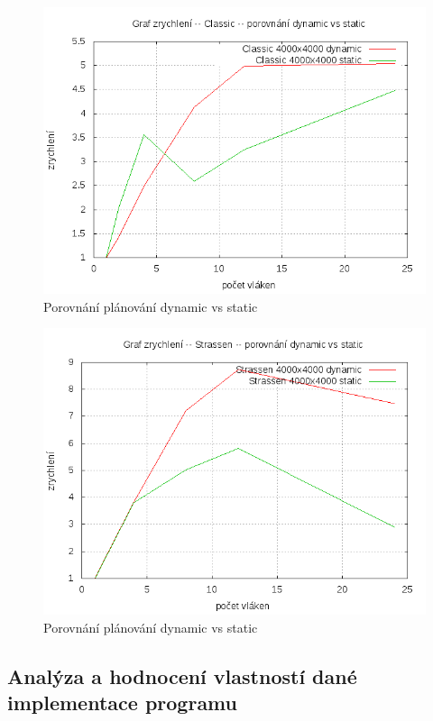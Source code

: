 \documentclass[12pt,a4paper]{article}
\begin{document}
\begin{figure}[h]
\includegraphics[width=\textwidth]{graph/classic-dynamic-vs-static.png}
\caption{Porovnání plánování dynamic vs static}
\label{data4}
\end{figure}

\pagebreak
\begin{figure}[h]
\includegraphics[width=\textwidth]{graph/strassen-dynamic-vs-static.png}
\caption{Porovnání plánování dynamic vs static}
\label{data4}
\end{figure}


\pagebreak
\subsection{Analýza a hodnocení vlastností dané implementace programu}
\end{document}
